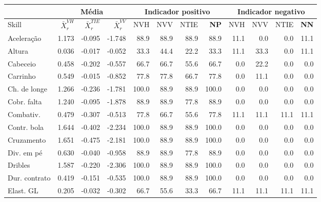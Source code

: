 \documentclass[review]{elsarticle}
\begin{document}
\begin{table}[ht]
\begin{small}
\begin{tabular}{l||rrr||rrr|r|||rrr||r}
  \hline
     \hline
\rowcolor{SeaGreen3!30!} & \multicolumn{3}{c||}{Média} &   \multicolumn{4}{c|||}{Indicador positivo} & \multicolumn{4}{c}{Indicador negativo} \\
\hline 
  \hline
\rowcolor{SeaGreen3!30!} Skill &  $\bar{X}_r^{VH}$ &  $\bar{X}_r^{TIE}$ &  $\bar{X}_r^{VV}$ & NVH & NVV & NTIE & \textbf{NP }& NVH & NVV & NTIE & \textbf{NN }\\ 
 \hline
\rowcolor{gray!30!} Aceleração & 1.173 & -0.095 & -1.748 & 88.9 & 88.9 & 88.9 & 88.9 & 11.1 & 0.0 & 0.0 & 11.1 \\ 
\rowcolor{gray!10!}  Altura & 0.036 & -0.017 & -0.052 & 33.3 & 44.4 & 22.2 & 33.3 & 11.1 & 33.3 & 0.0 & 11.1 \\ 
\rowcolor{gray!30!}   Cabeceio & 0.458 & -0.202 & -0.557 & 66.7 & 66.7 & 55.6 & 66.7 & 0.0 & 22.2 & 0.0 & 0.0 \\ 
\rowcolor{gray!10!}   Carrinho & 0.549 & -0.015 & -0.852 & 77.8 & 77.8 & 66.7 & 77.8 & 0.0 & 11.1 & 0.0 & 0.0 \\ 
 \rowcolor{gray!30!}  Ch. de longe & 1.266 & -0.236 & -1.781 & 100.0 & 88.9 & 88.9 & 100.0 & 0.0 & 0.0 & 0.0 & 0.0 \\ 
\rowcolor{gray!10!}   Cobr. falta & 1.240 & -0.095 & -1.878 & 88.9 & 88.9 & 77.8 & 88.9 & 0.0 & 0.0 & 0.0 & 0.0 \\ 
 \rowcolor{gray!30!}  Combativ. & 0.479 & -0.307 & -0.513 & 77.8 & 66.7 & 55.6 & 77.8 & 11.1 & 11.1 & 11.1 & 11.1 \\ 
\rowcolor{gray!10!}   Contr. bola & 1.644 & -0.402 & -2.234 & 100.0 & 88.9 & 88.9 & 100.0 & 0.0 & 0.0 & 0.0 & 0.0 \\ 
\rowcolor{gray!30!}   Cruzamento & 1.651 & -0.475 & -2.181 & 100.0 & 88.9 & 88.9 & 100.0 & 0.0 & 0.0 & 0.0 & 0.0 \\ 
\rowcolor{gray!10!}   Div. em pé & 0.630 & -0.040 & -0.958 & 88.9 & 88.9 & 77.8 & 88.9 & 0.0 & 0.0 & 0.0 & 0.0 \\ 
\rowcolor{gray!30!}   Dribles & 1.587 & -0.220 & -2.306 & 100.0 & 88.9 & 88.9 & 100.0 & 0.0 & 0.0 & 0.0 & 0.0 \\ 
\rowcolor{gray!10!}   Dur. contrato & 0.419 & -0.151 & -0.535 & 100.0 & 88.9 & 88.9 & 100.0 & 0.0 & 0.0 & 0.0 & 0.0 \\ 
\rowcolor{gray!30!}   Elast. GL & 0.205 & -0.032 & -0.302 & 66.7 & 55.6 & 33.3 & 66.7 & 11.1 & 11.1 & 11.1 & 11.1 \\ 

\end{tabular}
\end{small}
\end{table}
\end{document}
